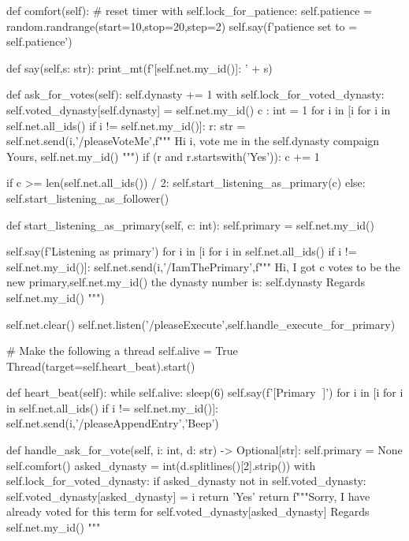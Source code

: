 \documentclass[dvipsnames]{ctexart}
\begin{document}
\begin{simplepy}
    def comfort(self):          # reset timer
        with self.lock_for_patience:
            self.patience = random.randrange(start=10,stop=20,step=2)
            self.say(f'patience set to = {self.patience}')

    def say(self,s: str):
        print_mt(f'[{self.net.my_id()}]: ' + s)

    def ask_for_votes(self):
        self.dynasty += 1
        with self.lock_for_voted_dynasty:
            self.voted_dynasty[self.dynasty] = self.net.my_id()
        c : int = 1
        for i in [i for i in self.net.all_ids() if i != self.net.my_id()]:
            r: str = self.net.send(i,'/pleaseVoteMe',f"""
            Hi {i}, vote me in the
               {self.dynasty}
                     compaign
                       Yours, {self.net.my_id()}
            """)
            if (r and r.startswith('Yes')):
                c += 1

        if c >= len(self.net.all_ids()) / 2:
            self.start_listening_as_primary(c)
        else:
            self.start_listening_as_follower()

    def start_listening_as_primary(self, c: int):
        self.primary = self.net.my_id()

        self.say(f'Listening as primary')
        for i in [i for i in self.net.all_ids() if i != self.net.my_id()]:
            self.net.send(i,'/IamThePrimary',f"""
            Hi, I got {c} votes to be the new primary,{self.net.my_id()}
                the dynasty number is:
                   {self.dynasty}
                               Regards {self.net.my_id()}
            """)

        self.net.clear()
        self.net.listen('/pleaseExecute',self.handle_execute_for_primary)



        # Make the following a thread
        self.alive = True
        Thread(target=self.heart_beat).start()

    def heart_beat(self):
        while self.alive:
            sleep(6)
            self.say(f'[Primary 💙]')
            for i in [i for i in self.net.all_ids() if i != self.net.my_id()]:
                self.net.send(i,'/pleaseAppendEntry','Beep')


    def handle_ask_for_vote(self, i: int, d: str) -> Optional[str]:
        self.primary = None
        self.comfort()
        asked_dynasty = int(d.splitlines()[2].strip())
        with self.lock_for_voted_dynasty:
            if asked_dynasty not in self.voted_dynasty:
                self.voted_dynasty[asked_dynasty] = i
                return 'Yes'
        return f"""Sorry,
              I have already voted for this term for
                     {self.voted_dynasty[asked_dynasty]}
                               Regards {self.net.my_id()}
        """


\end{simplepy}
\end{document}
